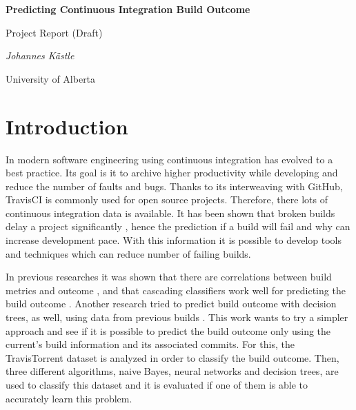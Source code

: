 \documentclass[a4paper,11pt]{article}
\begin{document}
	
	\begin{center}
	{\huge\bfseries Predicting Continuous Integration Build Outcome \par}
	{\Large Project Report (Draft)\par}
	
	\vspace{1cm}
	{\Large\itshape Johannes Kästle\par}
	{ University of Alberta \par}
	\end{center}


\setlength{\parindent}{0pt}
\setlength{\parskip}{1.5ex plus0.5ex minus0.5ex}

\begin{abstract}
	In order to improve developers productivity and increase pace, it is tried to predict the outcome of continuous integration builds. For that, $2,500,756$ builds with $37$ features were analyzed, using three different machine learning algorithms with over $700$ configurations. Generally, all classifiers struggled with predicting failures, but had high sensitivity. In the end, the decision tree classifier could predict the outcome with an accuracy of $76\%$ and performed significantly better than its competitors. 
\end{abstract}

\section{Introduction}

In modern software engineering using continuous integration has evolved to a best practice. Its goal is it to archive higher productivity while developing and reduce the number of faults and bugs. Thanks to its interweaving with GitHub, TravisCI is commonly used for open source projects. Therefore, there lots of continuous integration data is available. It has been shown that broken builds delay a project significantly \cite{CIDelay}, hence the prediction if a build will fail and why can increase development pace. With this information it is possible to develop tools and techniques which can reduce number of failing builds. 

In previous researches it was shown that there are correlations between build metrics and outcome \cite{correlation}, and that cascading classifiers work well for predicting the build outcome \cite{cascade}. Another research tried to predict build outcome with decision trees, as well, using data from previous builds \cite{treeTimes}. This work wants to try a simpler approach and see if it is possible to predict the build outcome only using the current's build information and its associated commits. For this, the TravisTorrent \cite{msr17challenge} dataset is analyzed in order to classify the build outcome. Then, three different algorithms, naive Bayes, neural networks and decision trees, are used to classify this dataset and it is evaluated if one of them is able to accurately learn this problem. 
\end{document}
